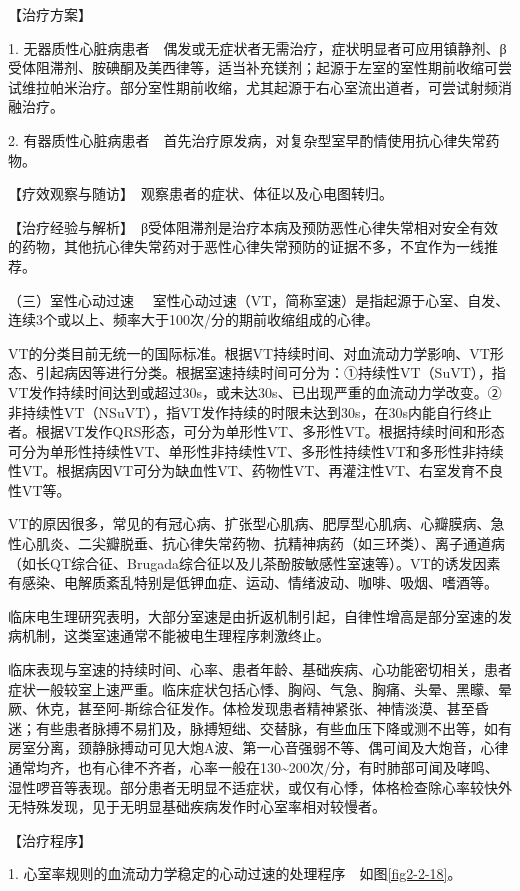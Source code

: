 【治疗方案】

1.
无器质性心脏病患者　偶发或无症状者无需治疗，症状明显者可应用镇静剂、β受体阻滞剂、胺碘酮及美西律等，适当补充镁剂；起源于左室的室性期前收缩可尝试维拉帕米治疗。部分室性期前收缩，尤其起源于右心室流出道者，可尝试射频消融治疗。

2.
有器质性心脏病患者　首先治疗原发病，对复杂型室早酌情使用抗心律失常药物。

【疗效观察与随访】　观察患者的症状、体征以及心电图转归。

【治疗经验与解析】　β受体阻滞剂是治疗本病及预防恶性心律失常相对安全有效的药物，其他抗心律失常药对于恶性心律失常预防的证据不多，不宜作为一线推荐。

{（三）室性心动过速}
　室性心动过速（VT，简称室速）是指起源于心室、自发、连续3个或以上、频率大于100次/分的期前收缩组成的心律。

VT的分类目前无统一的国际标准。根据VT持续时间、对血流动力学影响、VT形态、引起病因等进行分类。根据室速持续时间可分为：①持续性VT（SuVT），指VT发作持续时间达到或超过30s，或未达30s、已出现严重的血流动力学改变。②非持续性VT（NSuVT），指VT发作持续的时限未达到30s，在30s内能自行终止者。根据VT发作QRS形态，可分为单形性VT、多形性VT。根据持续时间和形态可分为单形性持续性VT、单形性非持续性VT、多形性持续性VT和多形性非持续性VT。根据病因VT可分为缺血性VT、药物性VT、再灌注性VT、右室发育不良性VT等。

VT的原因很多，常见的有冠心病、扩张型心肌病、肥厚型心肌病、心瓣膜病、急性心肌炎、二尖瓣脱垂、抗心律失常药物、抗精神病药（如三环类）、离子通道病（如长QT综合征、Brugada综合征以及儿茶酚胺敏感性室速等）。VT的诱发因素有感染、电解质紊乱特别是低钾血症、运动、情绪波动、咖啡、吸烟、嗜酒等。

临床电生理研究表明，大部分室速是由折返机制引起，自律性增高是部分室速的发病机制，这类室速通常不能被电生理程序刺激终止。

临床表现与室速的持续时间、心率、患者年龄、基础疾病、心功能密切相关，患者症状一般较室上速严重。临床症状包括心悸、胸闷、气急、胸痛、头晕、黑矇、晕厥、休克，甚至阿-斯综合征发作。体检发现患者精神紧张、神情淡漠、甚至昏迷；有些患者脉搏不易扪及，脉搏短绌、交替脉，有些血压下降或测不出等，如有房室分离，颈静脉搏动可见大炮A波、第一心音强弱不等、偶可闻及大炮音，心律通常均齐，也有心律不齐者，心率一般在130\textasciitilde{}200次/分，有时肺部可闻及哮鸣、湿性啰音等表现。部分患者无明显不适症状，或仅有心悸，体格检查除心率较快外无特殊发现，见于无明显基础疾病发作时心室率相对较慢者。

【治疗程序】

1. 心室率规则的血流动力学稳定的心动过速的处理程序　如图\ref{fig2-2-18}。

